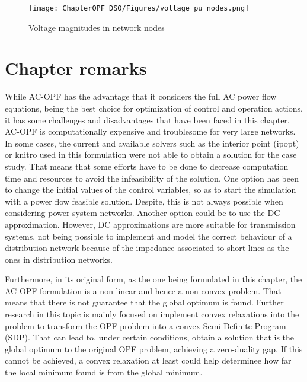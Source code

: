 \begin{figure}[htbp]
	\centering
	\texttt{[image: ChapterOPF\_DSO/Figures/voltage\_pu\_nodes.png]}
	\caption{Voltage magnitudes in network nodes}
	\label{fig:voltage_magnitudes}  
\end{figure}



\section{Chapter remarks}
While AC-OPF has the advantage that it considers the full AC power flow equations, being the best choice for optimization of control and operation actions, it has some challenges and disadvantages that have been faced in this chapter. AC-OPF is computationally expensive and troublesome for very large networks. In some cases, the current and available solvers such as the interior point (ipopt) or knitro used in this formulation were not able to obtain a solution for the case study. That means that some efforts have to be done to decrease computation time and resources to avoid the infeasibility of the solution. One option has been to change the initial values of the control variables, so as to start the simulation with a power flow feasible solution. Despite, this is not always possible when considering power system networks. Another option could be to use the DC approximation. However, DC approximations are more suitable for transmission systems, not being possible to implement and model the correct behaviour of a distribution network because of the impedance associated to short lines as the ones in distribution networks. 

Furthermore, in its original form, as the one being formulated in this chapter, the AC-OPF formulation is a non-linear and hence a non-convex problem. That means that there is not guarantee that the global optimum is found. Further research in this topic is mainly focused on implement convex relaxations into the problem to transform the OPF problem into a convex Semi-Definite Program (SDP). That can lead to, under certain conditions, obtain a solution that is the global optimum to the original OPF problem, achieving a zero-duality gap. If this cannot be achieved, a convex relaxation at least could help determinee how far the local minimum found is from the global minimum.  

